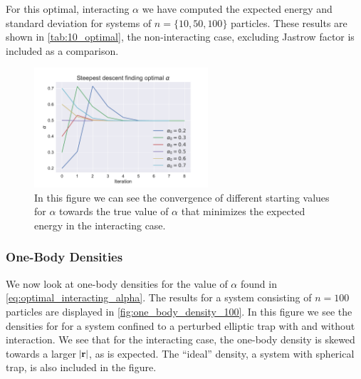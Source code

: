 \documentclass[
    a4paper, aps, twocolumn, floatfix, superscriptaddress,
    nofootinbib]{revtex4-1}
\newcommand{\vf}{\mathbf}
\newcommand{\1}{\mathds{1}}
\begin{document}
            For this optimal, interacting $\alpha$ we have computed the expected
            energy and standard deviation for systems of $n = \{10, 50, 100\}$
            particles. These results are shown in \autoref{tab:10_optimal}, the 
            non-interacting case, excluding Jastrow factor is included as a 
            comparison.

            \begin{figure}
                \includegraphics[width=244px]{../data/figures/problem_f.pdf}
                \caption{In this figure we can see the convergence of different
                starting values for $\alpha$ towards the true value of $\alpha$
                that minimizes the expected energy in the interacting case.}
                \label{fig:gradient_descent_interacting}
            \end{figure}

        \subsubsection{One-Body Densities}
            We now look at one-body densities for the value of $\alpha$ found in
            \autoref{eq:optimal_interacting_alpha}. The results for a system consisting
            of $n=100$ particles are displayed in \autoref{fig:one_body_density_100}.
            In this figure we see the densities for for a system confined to a 
            perturbed elliptic trap with and without interaction. We see that for the
            interacting case, the one-body density is skewed towards a larger 
            $\abs{\vf{r}}$, as is expected. The ``ideal'' density, a system with spherical
            trap, is also included in the figure. 
\end{document}
